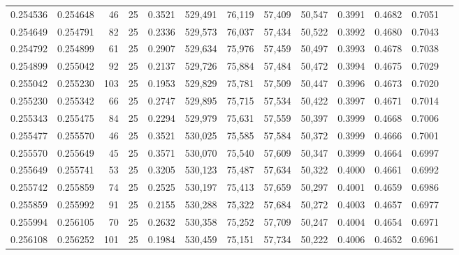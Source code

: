 \begin{tabular}{rrrrrrrrrrrrr}
0.254536 & 0.254648 &    46 &  25 &                                     0.3521 & 529,491 &  76,119 &  57,409 &  50,547 & 0.3991 & 0.4682 & 0.7051 \\
0.254649 & 0.254791 &    82 &  25 &                                     0.2336 & 529,573 &  76,037 &  57,434 &  50,522 & 0.3992 & 0.4680 & 0.7043 \\
0.254792 & 0.254899 &    61 &  25 &                                     0.2907 & 529,634 &  75,976 &  57,459 &  50,497 & 0.3993 & 0.4678 & 0.7038 \\
0.254899 & 0.255042 &    92 &  25 &                                     0.2137 & 529,726 &  75,884 &  57,484 &  50,472 & 0.3994 & 0.4675 & 0.7029 \\
0.255042 & 0.255230 &   103 &  25 &                                     0.1953 & 529,829 &  75,781 &  57,509 &  50,447 & 0.3996 & 0.4673 & 0.7020 \\
0.255230 & 0.255342 &    66 &  25 &                                     0.2747 & 529,895 &  75,715 &  57,534 &  50,422 & 0.3997 & 0.4671 & 0.7014 \\
0.255343 & 0.255475 &    84 &  25 &                                     0.2294 & 529,979 &  75,631 &  57,559 &  50,397 & 0.3999 & 0.4668 & 0.7006 \\
0.255477 & 0.255570 &    46 &  25 &                                     0.3521 & 530,025 &  75,585 &  57,584 &  50,372 & 0.3999 & 0.4666 & 0.7001 \\
0.255570 & 0.255649 &    45 &  25 &                                     0.3571 & 530,070 &  75,540 &  57,609 &  50,347 & 0.3999 & 0.4664 & 0.6997 \\
0.255649 & 0.255741 &    53 &  25 &                                     0.3205 & 530,123 &  75,487 &  57,634 &  50,322 & 0.4000 & 0.4661 & 0.6992 \\
0.255742 & 0.255859 &    74 &  25 &                                     0.2525 & 530,197 &  75,413 &  57,659 &  50,297 & 0.4001 & 0.4659 & 0.6986 \\
0.255859 & 0.255992 &    91 &  25 &                                     0.2155 & 530,288 &  75,322 &  57,684 &  50,272 & 0.4003 & 0.4657 & 0.6977 \\
0.255994 & 0.256105 &    70 &  25 &                                     0.2632 & 530,358 &  75,252 &  57,709 &  50,247 & 0.4004 & 0.4654 & 0.6971 \\
0.256108 & 0.256252 &   101 &  25 &                                     0.1984 & 530,459 &  75,151 &  57,734 &  50,222 & 0.4006 & 0.4652 & 0.6961 \\

\end{tabular}
